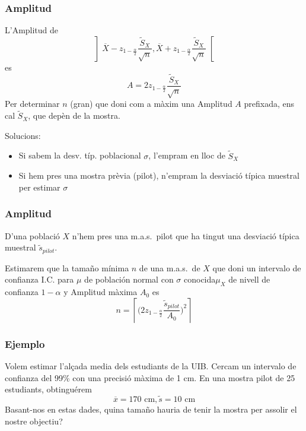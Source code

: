 \documentclass[12pt,t]{beamer}\usepackage[]{graphicx}\usepackage[]{color}
\renewcommand{\emph}[1]{{\color{red}#1}}
\theoremstyle{plain}
\theoremstyle{definition}
\begin{document}
\begin{frame}
\frametitle{Amplitud}
\vspace*{-2ex}

L'Amplitud de 
$$
\left]\overline{X}-z_{1-\frac{\alpha}{2}}\frac{\widetilde{S}_X}{\sqrt{n}},
    \overline{X}+z_{1-\frac{\alpha}{2}}\frac{\widetilde{S}_X}{\sqrt{n}}\right[
$$
es
$$
A=2z_{1-\frac{\alpha}{2}}\frac{\widetilde{S}_X}{\sqrt{n}}
$$
Per determinar $n$ (gran) que doni com a màxim una Amplitud $A$ prefixada, ens cal $\widetilde{S}_X$, que depèn de la mostra.
\medskip

 Solucions:
\begin{itemize}
\item Si sabem la desv. típ. poblacional $\sigma$, l'empram en lloc de $\widetilde{S}_X$

\item Si hem pres una mostra prèvia (\emph{pilot}), n'empram la desviació típica muestral per estimar $\sigma$

\end{itemize}



\end{frame}



\begin{frame}
\frametitle{Amplitud}

\begin{block}{}
D'una població $X$ n'hem pres una  \emph{m.a.s.\ pilot} que ha tingut una desviació típica muestral $\widetilde{s}_{pilot}$.
\medskip

Estimarem que la  tamaño  mínima $n$ de una m.a.s.\ de $X$ que doni un intervalo de confianza  I.C. para $\mu$ de población normal con $\sigma$ conocida$\mu_X$ de nivell de confianza  $1-\alpha$ y Amplitud màxima $A_0$ es 
$$
n=\left\lceil \Big(2z_{1-\frac{\alpha}{2}}\frac{\widetilde{s}_{pilot}}{A_0}\Big)^2\right\rceil
$$
\end{block}



\end{frame}





\begin{frame}
\frametitle{Ejemplo}

Volem estimar l'alçada media   dels estudiants de la UIB. Cercam  un intervalo de confianza  del 99\% con una precisió màxima de 1 cm. En una mostra pilot de 25 estudiants, obtinguérem 
$$
\overline{x} = 170\mbox{ cm}, \widetilde{s}=10\mbox{ cm}
$$
Basant-nos en estas  dades, quina  tamaño  hauria de tenir la mostra per assolir el nostre objectiu?

\end{frame}
\end{document}
